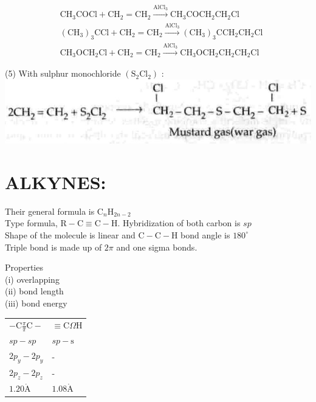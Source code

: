 \documentclass[10pt]{article}
\def\AA{\mathring{\mathrm{A}}}
\begin{document}
$$
\begin{aligned}
& \mathrm{CH}_{3} \mathrm{COCl}+\mathrm{CH}_{2}=\mathrm{CH}_{2} \xrightarrow{\mathrm{AlCl}_{3}} \mathrm{CH}_{3} \mathrm{COCH}_{2} \mathrm{CH}_{2} \mathrm{Cl} \\
& \left(\mathrm{CH}_{3}\right)_{3} \mathrm{CCl}+\mathrm{CH}_{2}=\mathrm{CH}_{2} \xrightarrow{\mathrm{AlCl}_{3}}\left(\mathrm{CH}_{3}\right)_{3} \mathrm{CCH}_{2} \mathrm{CH}_{2} \mathrm{Cl} \\
& \mathrm{CH}_{3} \mathrm{OCH}_{2} \mathrm{Cl}+\mathrm{CH}_{2}=\mathrm{CH}_{2} \xrightarrow{\mathrm{AlCl}_{3}} \mathrm{CH}_{3} \mathrm{OCH}_{2} \mathrm{CH}_{2} \mathrm{CH}_{2} \mathrm{Cl}
\end{aligned}
$$

(5) With sulphur monochloride $\left(\mathrm{S}_{2} \mathrm{Cl}_{2}\right)$ :\\
\includegraphics[max width=\textwidth, center]{2025_01_28_8470952b98110cec3aabg-186}

\section*{ALKYNES:}
Their general formula is $\mathrm{C}_{n} \mathrm{H}_{2 n-2}$\\
Type formula, $\mathrm{R}-\mathrm{C} \equiv \mathrm{C}-\mathrm{H}$. Hybridization of both carbon is $s p$\\
Shape of the molecule is linear and $\mathrm{C}-\mathrm{C}-\mathrm{H}$ bond angle is $180^{\circ}$\\
Triple bond is made up of $2 \pi$ and one sigma bonds.

Properties\\
(i) overlapping\\
(ii) bond length\\
(iii) bond energy

\begin{center}
\begin{tabular}{ll}
$-\mathrm{C} \frac{\pi}{\bar{\pi}} \mathrm{C}-$ & $\equiv \mathrm{C} \Omega \mathrm{H}$ \\
$s p-s p$ & $s p-\mathrm{s}$ \\
$2 p_{y}-2 p_{y}$ & - \\
$2 p_{z}-2 p_{z}$ & - \\
$1.20 \AA$ & $1.08 \AA$ \\
\end{tabular}
\end{center}
\end{document}
